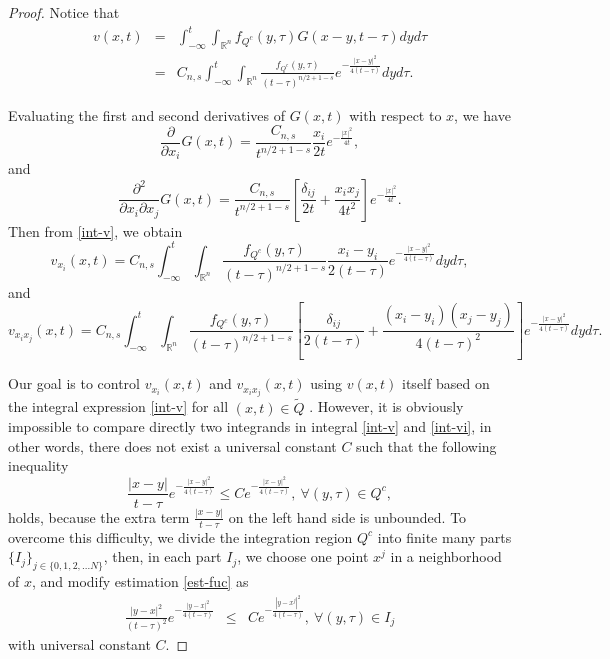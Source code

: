 \documentclass[12pt]{article}
\theoremstyle{remark}
\numberwithin{equation}{section}
\begin{document}
\begin{proof} Notice that
\begin{eqnarray}\nonumber
    \label{int-v}v(x,t)&=&\int_{-\infty}^t \int_{\mathbb{R}^n}  {f_{Q^c}(y,\tau)}G(x-y,t-\tau)dy d\tau\\
&=&C_{n,s}\int_{-\infty}^t \int_{\mathbb{R}^n}\frac{{f_{Q^c}(y,\tau)}}{(t-\tau)^{n/2+1-s}} e^{-\frac{|x-y|^2}{4(t-\tau)}}dyd\tau.\end{eqnarray}


Evaluating the first and second derivatives of $G(x,t)$  with respect to $x$, we have
\[\frac{\partial}{\partial {x_i}}G(x,t)= \frac{C_{n,s}}{t^{n/2+1-s}}\frac{x_i}{2t}e^{-\frac{|x|^2}{4t}},\]
and
\[\frac{\partial^2}{\partial {x_i}\partial {x_j}}G(x,t)= \frac{C_{n,s}}{t^{n/2+1-s}}\left[\frac{\delta_{ij}}{2t} +\frac{x_ix_j}{4t^2}\right]e^{-\frac{|x|^2}{4t}}.\]
Then from \eqref{int-v}, we obtain\begin{equation}\label{int-vi}
v_{x_i}(x,t)=C_{n,s}\int_{-\infty}^t \int_{\mathbb{R}^n}  \frac{f_{Q^c}(y,\tau)}{(t-\tau)^{n/2+1-s}} \frac{x_i-y_i}{2(t-\tau)}e^{-\frac{|x-y|^2}{4(t-\tau)}} dy d\tau,
\end{equation}
and
\begin{equation}\label{int-vij}
v_{x_{i}x_{j}}(x,t)=C_{n,s}\int_{-\infty}^t \int_{\mathbb{R}^n}  \frac{f_{Q^c}(y,\tau)}{(t-\tau)^{n/2+1-s}} \left[\frac{\delta_{ij}}{2(t-\tau)} +\frac{(x_i-y_i)(x_j-y_j)}{4(t-\tau)^2}\right]e^{-\frac{|x-y|^2}{4(t-\tau)}}dy d\tau.
\end{equation}

Our goal is to control $v_{x_i}(x,t)$ and $v_{x_ix_j}(x,t)$ using $v(x,t)$ itself based on the integral expression \eqref{int-v} for all   $(x,t)\in\tilde Q$ . However, it is obviously impossible  to  compare directly two integrands in integral \eqref{int-v} and \eqref{int-vi}, in other words, there does not exist a universal constant $C$ such that the following inequality
\begin{equation}\label{est-fuc}\frac{|x-y|}{t-\tau}e^{-\frac{|x-y|^2}{4(t-\tau)}}\leq Ce^{-\frac{|x-y|^2}{4(t-\tau)}}, \ \forall(y,\tau)\in Q^c,\end{equation}
holds, because the extra term $\frac{|x-y|}{t-\tau}$ on the left hand side is unbounded.  To overcome this difficulty,  we divide the integration region $Q^c$ into  finite many parts $\{I_j\}_{j\in\{0,1,2,...N\}}$, then, in each part $I_j$, we choose one point $x^j$ in a neighborhood of $x$, and  modify estimation   \eqref{est-fuc} as
\begin{eqnarray}
\frac{|y-x|^2}{(t-\tau)^2} e^{-\frac{|y-x|^2}{4(t-\tau)}}
& \leq & Ce^{-\frac{|y-x^j|^2}{4(t-\tau)}}, \ \forall(y,\tau)\in I_j \label{key est}
\end{eqnarray}
with universal constant $C$.



\end{proof}
\end{document}
